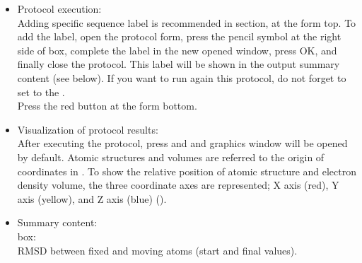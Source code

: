 \begin{itemize}
 \item Protocol execution:\\
 Adding specific sequence label is recommended in  section, at the form top. To add the label, open the protocol form, press the pencil symbol at the right side of  box, complete the label in the new opened window, press OK, and finally close the protocol. This label will be shown in the output summary content (see below). If you want to run again this protocol, do not forget to set to  the .\\
  Press the  red button at the form bottom.\\
  
 \item Visualization of protocol results:\\
 
 After executing the protocol, press  and and \chimera graphics window will be opened by default. Atomic structures and volumes are referred to the origin of coordinates in \chimera. To show the relative position of atomic structure and electron density volume, the three coordinate axes are represented; X axis (red), Y axis (yellow), and Z axis (blue) ().\\
    
 \item Summary content:\\
 
   box:\\RMSD between fixed and moving atoms (start and final values).
\end{itemize}

